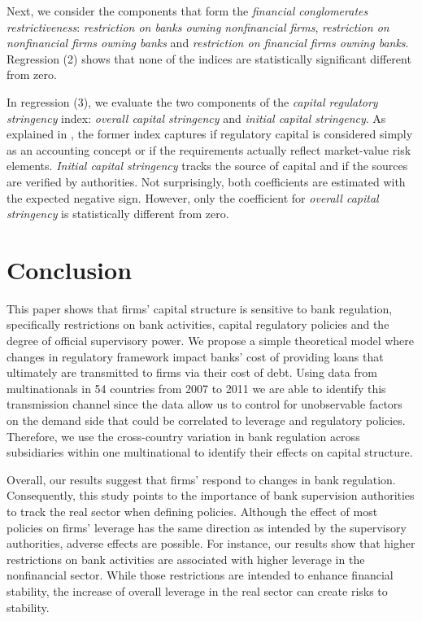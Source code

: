\documentclass[12pt]{article}
\begin{document}
Next, we consider the components that form the \textit{financial conglomerates restrictiveness}: \textit{restriction on banks owning nonfinancial firms}, \textit{restriction on nonfinancial firms owning banks} and \textit{restriction on financial firms owning banks}. Regression (2) shows that none of the indices are statistically significant different from zero.

In regression (3), we evaluate the two components of the \textit{capital regulatory stringency} index: \textit{overall capital stringency} and \textit{initial capital stringency}.  As explained in \cite*{barth2001regulation}, the former index captures if regulatory capital is considered simply as an accounting concept or if the requirements actually reflect market-value risk elements. \textit{Initial capital stringency} tracks the source of capital and if the sources are verified by authorities. Not surprisingly, both coefficients are estimated with the expected negative sign. However, only the coefficient for \textit{overall capital stringency} is statistically different from zero.
    	
	\section{Conclusion} \label{sec:conclusion}
		
	This paper shows that firms' capital structure is sensitive to bank regulation, specifically restrictions on bank activities, capital regulatory policies and the degree of official supervisory power. We propose a simple theoretical model where changes in regulatory framework impact banks' cost of providing loans that ultimately are transmitted to firms via their cost of debt. Using data from multinationals in 54 countries from 2007 to 2011 we are able to identify this transmission channel since the data allow us to control for unobservable factors on the demand side that could be correlated to leverage and regulatory policies. Therefore, we use the cross-country variation in bank regulation across subsidiaries within one multinational to identify their effects on capital structure.
	
	Overall, our results suggest that firms' respond to changes in bank regulation. Consequently, this study points to the importance of bank supervision authorities to track the real sector when defining policies. Although the effect of most policies on firms' leverage has the same direction as intended by the supervisory authorities, adverse effects are possible. For instance, our results show that higher restrictions on bank activities are associated with higher leverage in the nonfinancial sector. While those restrictions are intended to enhance financial stability, the increase of overall leverage in the real sector can create risks to stability.
	
\end{document}
